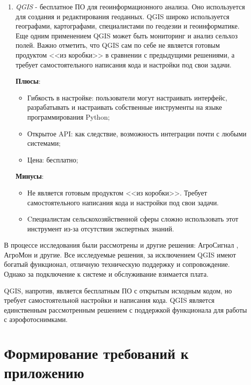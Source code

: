 \begin{enumerate}
      \item \textit{QGIS}\cite{qgis} - бесплатное ПО для геоинформационного анализа. Оно используется для создания и редактирования геоданных. QGIS широко используется географами, картографами, специалистами по геодезии и геоинформатике. Еще одним применением QGIS может быть мониторинг и анализ сельхоз полей. Важно отметить, что QGIS сам по себе не является готовым продуктом <<из коробки>> в сравнении с предыдущими решениями, а требует самостоятельного написания кода и настройки под свои задачи. 
         
        \textbf{Плюсы}:  
        \begin{itemize}
                \item Гибкость в настройке: пользователи могут настраивать интерфейс, разрабатывать и настраивать собственные инструменты на языке программирования Python;
                \item Открытое API: как следствие, возможность интеграции почти с любыми системами;
                \item Цена: бесплатно;
        \end{itemize}
        \textbf{Минусы}:
        \begin{itemize}
                \item Не является готовым продуктом <<из коробки>>. Требует самостоятельного написания кода и настройки под свои задачи.
                \item Cпециалистам сельскохозяйственной сферы сложно использовать этот инструмент из-за отсутствия экспертных знаний.
                
        \end{itemize}
    \end{enumerate}

    
    В процессе исследования были рассмотрены и другие решения: АгроСигнал \cite{agrosignal}, АгроМон \cite{agromon} и другие. Все исследуемые решения, за исключением QGIS имеют богатый функционал, отличную техническую поддержку и сопровождение. Однако за подключение к системе и обслуживание взимается плата. 

    QGIS, напротив, является бесплатным ПО с открытым исходным кодом, но требует самостоятельной настройки и написания кода. QGIS является единственным рассмотренным решением с поддержкой функционала для работы с аэрофотоснимками.


\chapter{Формирование требований к приложению}
